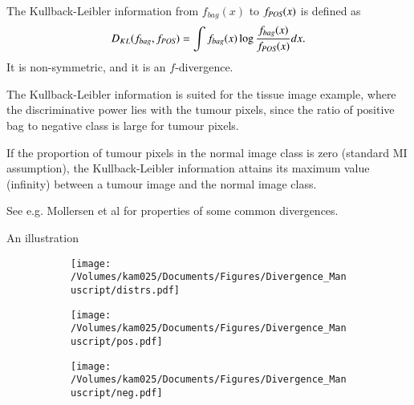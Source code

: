 The Kullback-Leibler information from $f_{bag}(x)$ to $f_{\text{\scriptsize{{\it POS}}}}(x)$ is defined as
\begin{align}
  D_{KL}(f_{bag},f_{\text{\scriptsize{{\it POS}}}}) = \int f_{bag}(x) \log \frac{f_{bag}(x)}{f_{\text{\scriptsize{{\it POS}}}} (x)} dx.
\end{align}
It is non-symmetric, and it is an $f$-divergence. 

The Kullback-Leibler information is suited for the tissue image example, where the discriminative power lies with the tumour pixels, since the ratio of positive bag to negative class is large for tumour pixels. 

If the proportion of tumour pixels in the normal image class is zero (standard MI assumption), the Kullback-Leibler information attains its maximum value (infinity) between a tumour image and the normal image class. 



See e.g. {\color{green} Mollersen et al} for properties of some common divergences. 

An illustration
\begin{figure}[!h]
  \centering
  \begin{subfigure}{}
    \texttt{[image: /Volumes/kam025/Documents/Figures/Divergence\_Manuscript/distrs.pdf]}
  \end{subfigure}    
  \begin{subfigure}{}
    \texttt{[image: /Volumes/kam025/Documents/Figures/Divergence\_Manuscript/pos.pdf]}
  \end{subfigure}
  \begin{subfigure}{}
    \texttt{[image: /Volumes/kam025/Documents/Figures/Divergence\_Manuscript/neg.pdf]}
  \end{subfigure}
\end{figure}

